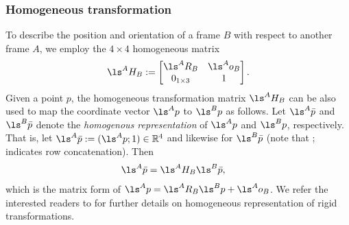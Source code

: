 \subsubsection{Homogeneous transformation}
To describe the position and orientation of a frame $B$ with respect to another frame $A$, we employ the $4\times4$ homogeneous matrix
\begin{equation}
  \label{eq:homogeneousTransformation}
  \ls^A H_B :=
     \begin{bmatrix}
     \ls^A R_B & \ls^A o_B \\
     0_{1\times3} & 1
  \end{bmatrix} .
\end{equation}
Given a point $p$, the homogeneous transformation matrix $\ls^A H_B$ can be also used to map the coordinate vector $\ls^A p$ to $\ls^B p$ as follows. Let 
$\ls^A \bar p$ and $\ls^B \bar p$ denote the {\em homogenous representation} of $\ls^A p$ and $\ls^B p$, respectively. That is, let
$\ls^A \bar p := (\ls^A p; 1) \in \mathbb{R}^4$ and likewise for
$\ls^B \bar p$ (note that ; indicates row concatenation). Then
\begin{align} \label{eq:Abp_AHB_Bbp}
  \ls^A \bar p 
& = 
  \ls^A H_B \ls^B \bar p ,
\end{align}
which is the matrix form of 
$\ls^A p = \ls^A R_B \ls^B p + \ls^A o_B$. We refer the interested readers to \citep[Chapter 2]{murray1994} for further details on homogeneous representation of rigid transformations. 

